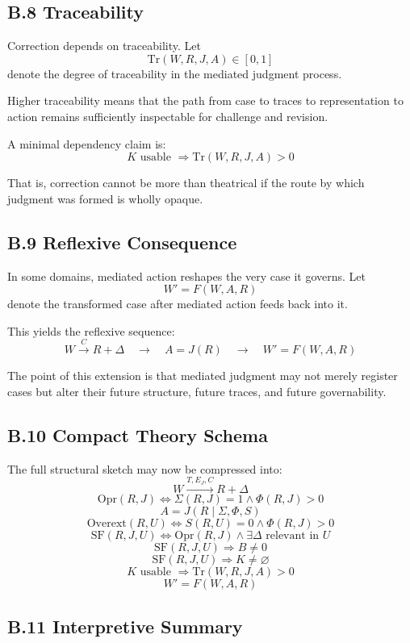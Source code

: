 \documentclass[11pt]{article}
\begin{document}
\subsection*{B.8 Traceability}

Correction depends on traceability. Let
\[
\mathrm{Tr}(W,R,J,A)\in[0,1]
\]
denote the degree of traceability in the mediated judgment process.

Higher traceability means that the path from case to traces to representation to action remains sufficiently inspectable for challenge and revision.

A minimal dependency claim is:
\[
K \text{ usable } \Rightarrow \mathrm{Tr}(W,R,J,A) > 0
\]

That is, correction cannot be more than theatrical if the route by which judgment was formed is wholly opaque.

\subsection*{B.9 Reflexive Consequence}

In some domains, mediated action reshapes the very case it governs. Let
\[
W' = F(W,A,R)
\]
denote the transformed case after mediated action feeds back into it.

This yields the reflexive sequence:
\[
W \xrightarrow{C} R + \Delta
\quad\longrightarrow\quad
A = J(R)
\quad\longrightarrow\quad
W' = F(W,A,R)
\]

The point of this extension is that mediated judgment may not merely register cases but alter their future structure, future traces, and future governability.

\subsection*{B.10 Compact Theory Schema}

The full structural sketch may now be compressed into:
\[
W \xrightarrow{T,E_J,C} R + \Delta
\]
\[
\mathrm{Opr}(R,J) \iff \Sigma(R,J)=1 \wedge \Phi(R,J)>0
\]
\[
A = J(R \mid \Sigma,\Phi,S)
\]
\[
\mathrm{Overext}(R,U) \iff S(R,U)=0 \wedge \Phi(R,J)>0
\]
\[
\mathrm{SF}(R,J,U) \iff \mathrm{Opr}(R,J) \wedge \exists \Delta \text{ relevant in } U
\]
\[
\mathrm{SF}(R,J,U) \Rightarrow B \neq 0
\]
\[
\mathrm{SF}(R,J,U) \Rightarrow K \neq \varnothing
\]
\[
K \text{ usable } \Rightarrow \mathrm{Tr}(W,R,J,A)>0
\]
\[
W' = F(W,A,R)
\]

\subsection*{B.11 Interpretive Summary}
\end{document}
